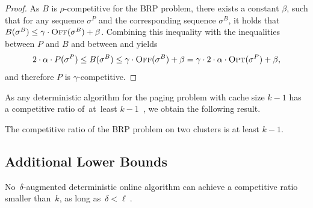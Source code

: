 \begin{proof}
As $B$ is $\rho$-competitive for the BRP problem, there exists a constant
$\beta$, such that for any sequence $\sigma^P$ and the corresponding sequence
$\sigma^B$, it holds that $B(\sigma^B) \leq \gamma \cdot \textsc{Off}(\sigma^B) +
\beta$. Combining this inequality with the inequalities between $P$ and $B$
and between \OFF and \OPT yields
\[
	2 \cdot \alpha \cdot P(\sigma^P) \leq 
	B(\sigma^B) \leq \gamma \cdot \textsc{Off}(\sigma^B) + \beta
	 =\gamma \cdot 2 \cdot \alpha \cdot \textsc{Opt}(\sigma^P) + \beta,
\]
and therefore $P$ is $\gamma$-competitive.
\end{proof}

As any deterministic algorithm for the paging problem with cache size $k-1$
has a competitive ratio of~at~least $k-1$~\cite{SleTar85}, we obtain the
following result.

\begin{corollary}
The competitive ratio of the BRP problem on two clusters is at least $k-1$. 
\end{corollary}


\subsection{Additional Lower Bounds}
\label{sec:lower-bounds}

\begin{theorem}\label{thm:loweraugmk}
No~$\delta$-augmented deterministic online algorithm \ONL
can achieve a competitive ratio smaller than~$k$, as long as~$\delta < \ell~$.
\end{theorem}

